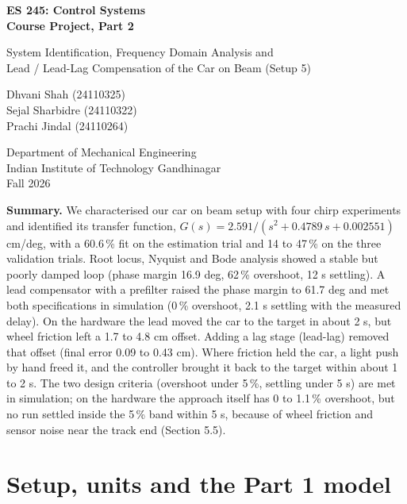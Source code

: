 \documentclass[11pt,a4paper]{article}
\begin{document}
\begin{titlepage}\centering
\vspace*{3cm}
{\LARGE\bfseries ES 245: Control Systems\\[4pt] Course Project, Part 2\par}
\vspace{0.8cm}
{\large System Identification, Frequency Domain Analysis and\\ Lead / Lead-Lag Compensation of the Car on Beam (Setup 5)\par}
\vspace{1.5cm}
Dhvani Shah (24110325)\\ Sejal Sharbidre (24110322)\\ Prachi Jindal (24110264)\par
\vspace{1cm}
Department of Mechanical Engineering\\ Indian Institute of Technology Gandhinagar\\ Fall 2026\par
\vspace{1.5cm}
\begin{minipage}{0.85\linewidth}
\textbf{Summary.} We characterised our car on beam setup with four chirp experiments and identified its transfer function, $G(s) = 2.591/(s^2 + 0.4789\,s + 0.002551)$ cm/deg, with a 60.6\,\% fit on the estimation trial and 14 to 47\,\% on the three validation trials. Root locus, Nyquist and Bode analysis showed a stable but poorly damped loop (phase margin 16.9 deg, 62\,\% overshoot, 12 s settling). A lead compensator with a prefilter raised the phase margin to 61.7 deg and met both specifications in simulation (0\,\% overshoot, 2.1 s settling with the measured delay). On the hardware the lead moved the car to the target in about 2 s, but wheel friction left a 1.7 to 4.8 cm offset. Adding a lag stage (lead-lag) removed that offset (final error 0.09 to 0.43 cm). Where friction held the car, a light push by hand freed it, and the controller brought it back to the target within about 1 to 2 s. The two design criteria (overshoot under 5\,\%, settling under 5 s) are met in simulation; on the hardware the approach itself has 0 to 1.1\,\% overshoot, but no run settled inside the 5\,\% band within 5 s, because of wheel friction and sensor noise near the track end (Section 5.5).
\end{minipage}
\end{titlepage}
\tableofcontents
\newpage
\hypertarget{setup-units-and-the-part-1-model}{%
\section{Setup, units and the Part 1
model}\label{setup-units-and-the-part-1-model}}
\end{document}
